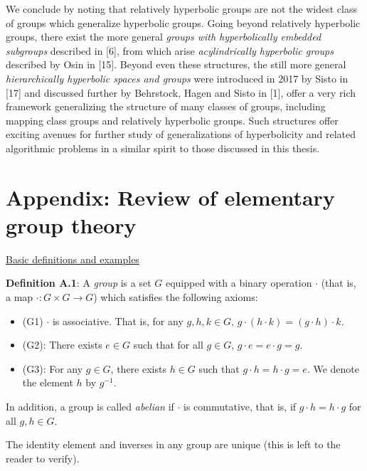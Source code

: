 \documentclass[12pt]{article}
\newcommand{\vs}{\vskip10pt}
\begin{document}
	We conclude by noting that relatively hyperbolic groups are not the widest class of groups which generalize hyperbolic groups. Going beyond relatively hyperbolic groups, there exist the more general \textit{groups with hyperbolically embedded subgroups} described in [6], from which arise \textit{acylindrically hyperbolic groups} described by Osin in [15]. Beyond even these structures, the still more general \textit{hierarchically hyperbolic spaces and groups} were introduced in 2017 by Sisto in [17] and discussed further by Behrstock, Hagen and Sisto in [1], offer a very rich framework generalizing the structure of many classes of groups, including mapping class groups and relatively hyperbolic groups. Such structures offer exciting avenues for further study of generalizations of hyperbolicity and related algorithmic problems in a similar spirit to those discussed in this thesis. 
	
	
	\newpage
	
	\section{Appendix: Review of elementary group theory}
	
	\underline{Basic definitions and examples}
	
	\vs
	
	\textbf{Definition A.1}: A \textit{group} is a set $G$ equipped with a binary operation $\cdot$ (that is, a map $\cdot: G \times G \rightarrow G$) which satisfies the following axioms: 
	
	\begin{itemize}
		\item (G1) $\cdot$ is associative. That is, for any $g,h,k \in G$, $g\cdot(h \cdot k) = (g \cdot h) \cdot k$.
		\item (G2): There exists $e \in G$ such that for all $g \in G$, $g\cdot e = e \cdot g = g$.
		\item (G3): For any $g \in G$, there exists $h \in G$ such that $g \cdot h = h \cdot g = e$. We denote the element $h$ by $g^{-1}$.
	\end{itemize}
	
	In addition, a group is called \textit{abelian} if $\cdot$ is commutative, that is, if $g \cdot h = h \cdot g$ for all $g,h \in G$. 
	
	\vs 
	
	The identity element and inverses in any group are unique (this is left to the reader to verify). 
	
	\vs
	
\end{document}
